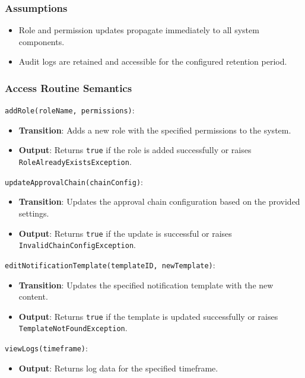 \documentclass[12pt, titlepage]{article}
\begin{document}
\subsubsection{Assumptions}
\begin{itemize}
    \item Role and permission updates propagate immediately to all system components.
    \item Audit logs are retained and accessible for the configured retention period.
\end{itemize}

\subsubsection{Access Routine Semantics}

\noindent \texttt{addRole(roleName, permissions)}:
\begin{itemize}
    \item \textbf{Transition}: Adds a new role with the specified permissions to the system.
    \item \textbf{Output}: Returns \texttt{true} if the role is added successfully or raises \texttt{RoleAlreadyExistsException}.
\end{itemize}

\noindent \texttt{updateApprovalChain(chainConfig)}:
\begin{itemize}
    \item \textbf{Transition}: Updates the approval chain configuration based on the provided settings.
    \item \textbf{Output}: Returns \texttt{true} if the update is successful or raises \texttt{InvalidChainConfigException}.
\end{itemize}

\noindent \texttt{editNotificationTemplate(templateID, newTemplate)}:
\begin{itemize}
    \item \textbf{Transition}: Updates the specified notification template with the new content.
    \item \textbf{Output}: Returns \texttt{true} if the template is updated successfully or raises \texttt{TemplateNotFoundException}.
\end{itemize}

\noindent \texttt{viewLogs(timeframe)}:
\begin{itemize}
    \item \textbf{Output}: Returns log data for the specified timeframe.
\end{itemize}
\end{document}
